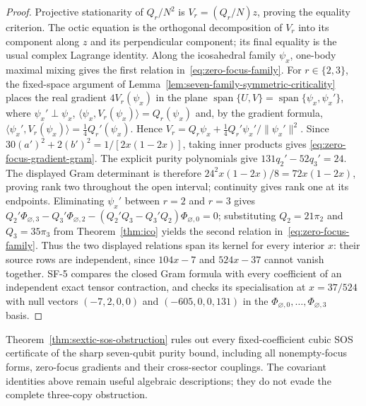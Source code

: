 \begin{proof}
Projective stationarity of $Q_r/N^2$ is
$V_r=(Q_r/N)z$, proving the equality criterion.
The octic equation is the orthogonal decomposition of
$V_r$ into its component along $z$ and its perpendicular
component; its final equality is the usual complex
Lagrange identity. Along the icosahedral family $\psi_x$,
one-body maximal mixing gives the first relation in~\eqref{eq:zero-focus-family}.
For $r\in\{2,3\}$, the fixed-space argument of
Lemma~\ref{lem:seven-family-symmetric-criticality} places the real gradient
$4V_r(\psi_x)$ in the plane
$\operatorname{span}\{U,V\}=\operatorname{span}\{\psi_x,\psi_x'\}$, where
$\psi_x'\perp\psi_x$, $\langle\psi_x,V_r(\psi_x)\rangle=Q_r(\psi_x)$ and, by the gradient formula,
$\langle\psi_x',V_r(\psi_x)\rangle=\tfrac14 Q_r'(\psi_x)$.
Hence $V_r=Q_r\psi_x+\tfrac14Q_r'\psi_x'/\|\psi_x'\|^2$.
Since $30(a')^2+2(b')^2=1/[2x(1-2x)]$, taking inner products gives
\eqref{eq:zero-focus-gradient-gram}. The explicit purity polynomials give
$131q_2'-52q_3'=24$. The displayed Gram determinant is therefore
$24^2x(1-2x)/8=72x(1-2x)$, proving rank two throughout the open
interval; continuity gives rank one at its endpoints.
Eliminating $\psi_x'$ between $r=2$ and $r=3$ gives
$Q_2'\Phi_{\varnothing,3}-Q_3'\Phi_{\varnothing,2}-(Q_2'Q_3-Q_3'Q_2)\Phi_{\varnothing,0}=0$;
substituting $Q_2=21\pi_2$ and $Q_3=35\pi_3$ from Theorem~\ref{thm:ico} yields the second
relation in~\eqref{eq:zero-focus-family}.
Thus the two displayed relations span its kernel for every interior $x$:
their source rows are independent, since $104x-7$ and $524x-37$
cannot vanish together. SF-5 compares the closed Gram formula with every
coefficient of an independent exact tensor contraction, and checks its
specialisation at $x=37/524$ with null vectors
$(-7,2,0,0)$ and $(-605,0,0,131)$ in the
$\Phi_{\varnothing,0},\ldots,\Phi_{\varnothing,3}$ basis.
\end{proof}

\begin{remark}
Theorem~\ref{thm:sextic-sos-obstruction} rules out every fixed-coefficient
cubic SOS certificate of the sharp seven-qubit purity bound,
including all nonempty-focus forms, zero-focus gradients and their
cross-sector couplings. The
covariant identities above remain useful algebraic descriptions;
they do not evade the complete three-copy obstruction.
\end{remark}

